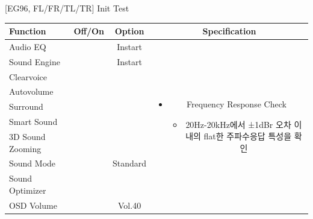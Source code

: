 \documentclass{beamer}
\begin{document}
\begin{frame}[t]{[EG96, FL/FR/TL/TR] Init Test}
\begin{tiny}
\begin{tabular}{@{}lccc@{}}
\toprule
Function & Off/On & Option & Specification \\
\midrule
Audio EQ & \color{black}{Off} & Instart &
\multirow{10}{60mm}{
\begin{itemize}\vspace{-3mm}
\item Frequency Response Check
	\begin{itemize}
	\item 20Hz-20kHz에서 ±1dBr 오차 이내의 flat한 주파수응답 특성을 확인
	\end{itemize}
\end{itemize}
} \\
Sound Engine & \color{blue}{On} & Instart & \\
Clearvoice & \color{black}{Off} & & \\
Autovolume & \color{black}{Off} & & \\
Surround & \color{black}{Off} & & \\
Smart Sound & \color{black}{Off} & & \\
3D Sound Zooming & \color{black}{Off} & & \\
Sound Mode & \color{blue}{On} & Standard & \\
Sound Optimizer & \color{black}{Off} & & \\
OSD Volume & \color{blue}{On} & Vol.40 & \\
\midrule
\end{tabular}
\end{tiny}

\end{frame}
\end{document}

